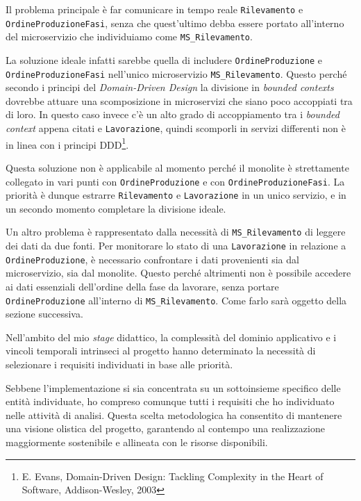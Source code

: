         \vspace{0.2 em}
        \noindent Il problema principale è far comunicare in tempo reale \texttt{Rilevamento} e \texttt{OrdineProduzioneFasi}, senza che quest'ultimo debba essere portato all'interno del microservizio che individuiamo come \texttt{MS\_Rilevamento}.

        \vspace{0.2 em}
        \noindent La soluzione ideale infatti sarebbe quella di includere \texttt{OrdineProduzione} e \texttt{OrdineProduzioneFasi} nell'unico microservizio \texttt{MS\_Rilevamento}. Questo perché secondo i principi del \textit{Domain-Driven Design} la divisione in \textit{bounded contexts} dovrebbe attuare una scomposizione in microservizi che siano poco accoppiati tra di loro. In questo caso invece c'è un alto grado di accoppiamento tra i \textit{bounded context} appena citati e  \texttt{Lavorazione}, quindi scomporli in servizi differenti non è in linea con i principi DDD\footnote{E. Evans, Domain-Driven Design: Tackling Complexity in the Heart of Software, Addison-Wesley, 2003}.

        \vspace{0.2 em}
        \noindent Questa soluzione non è applicabile al momento perché il monolite è strettamente collegato in vari punti con \texttt{OrdineProduzione} e con \texttt{OrdineProduzioneFasi}. La priorità è dunque estrarre \texttt{Rilevamento} e \texttt{Lavorazione} in un unico servizio, e in un secondo momento completare la divisione ideale.

        \vspace{0.2 em}
        \noindent Un altro problema è rappresentato dalla necessità di \texttt{MS\_Rilevamento} di leggere dei dati da due fonti. Per monitorare lo stato di una \texttt{Lavorazione} in relazione a \texttt{OrdineProduzione}, è necessario confrontare i dati provenienti sia dal microservizio, sia dal monolite. Questo perché altrimenti non è possibile accedere ai dati essenziali dell'ordine della fase da lavorare, senza portare \texttt{OrdineProduzione} all'interno di \texttt{MS\_Rilevamento}. Come farlo sarà oggetto della sezione successiva. 

        \vspace{0.2 em}
        \noindent Nell'ambito del mio \textit{stage} didattico, la complessità del dominio applicativo e i vincoli temporali intrinseci al progetto hanno determinato la necessità di selezionare i requisiti individuati in base alle priorità.

        \vspace{0.2 em}
        \noindent Sebbene l'implementazione si sia concentrata su un sottoinsieme specifico delle entità individuate, ho compreso comunque tutti i requisiti che ho individuato nelle attività di analisi. Questa scelta metodologica ha consentito di mantenere una visione olistica del progetto, garantendo al contempo una realizzazione maggiormente sostenibile e allineata con le risorse disponibili.

